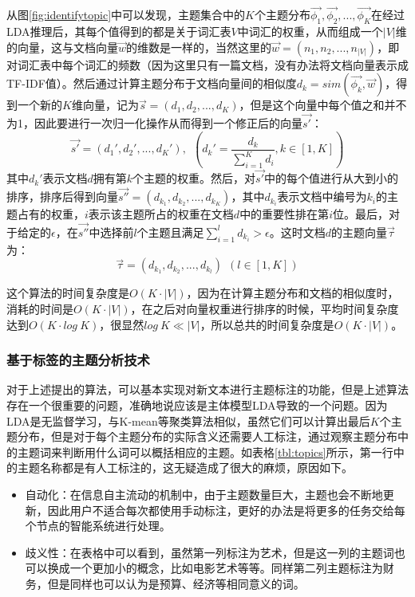 从图\ref{fig:identifytopic}中可以发现，主题集合中的$K$个主题分布$\vec{\phi_1},\vec{\phi_2},...,\vec{\phi_K}$在经过LDA推理后，其每个值得到的都是关于词汇表$V$中词汇的权重，从而组成一个$|V|$维的向量，这与文档向量$\vec{w}$的维数是一样的，当然这里的$\vec{w}=(n_1,n_2,...,n_{|V|})$，即对词汇表中每个词汇的频数（因为这里只有一篇文档，没有办法将文档向量表示成TF-IDF值）。然后通过计算主题分布于文档向量间的相似度$d_k=sim(\vec{\phi_k},\vec{w})$，得到一个新的$K$维向量，记为$\vec{s}=(d_1,d_2,...,d_K)$，但是这个向量中每个值之和并不为1，因此要进行一次归一化操作从而得到一个修正后的向量$\vec{s'}$：
\begin{equation}
  \vec{s'}=(d_1',d_2',...,d_K'),~~(d_k'=\frac{d_k}{\sum_{i=1}^{K}d_i},k\in[1,K])
\end{equation}
其中$d_k'$表示文档$d$拥有第$k$个主题的权重。然后，对$\vec{s'}$中的每个值进行从大到小的排序，排序后得到向量$\vec{s''}=(d_{k_1},d_{k_2},...,d_{k_K})$，其中$d_{k_i}$表示文档中编号为$k_i$的主题占有的权重，$i$表示该主题所占的权重在文档$d$中的重要性排在第$i$位。最后，对于给定的$\epsilon$，在$\vec{s''}$中选择前$l$个主题且满足$\sum_{i=1}^{l}d_{k_i}>\epsilon$。这时文档$d$的主题向量$\vec{\tau}$为：
\begin{equation}
  \vec{\tau}=(d_{k_1},d_{k_2},...,d_{k_l})~~(l\in[1,K])
\end{equation}

这个算法的时间复杂度是$O(K\cdot |V|)$，因为在计算主题分布和文档的相似度时，消耗的时间是$O(K\cdot |V|)$，在之后对向量权重进行排序的时候，平均时间复杂度达到$O(K\cdot log~K)$，很显然$log~K\ll|V|$，所以总共的时间复杂度是$O(K\cdot |V|)$。

\subsubsection{基于标签的主题分析技术}
对于上述提出的算法，可以基本实现对新文本进行主题标注的功能，但是上述算法存在一个很重要的问题，准确地说应该是主体模型LDA导致的一个问题。因为LDA是无监督学习，与K-mean等聚类算法相似，虽然它们可以计算出最后$K$个主题分布，但是对于每个主题分布的实际含义还需要人工标注，通过观察主题分布中的主题词来判断用什么词可以概括相应的主题。如表格\ref{tbl:topics}所示，第一行中的主题名称都是有人工标注的，这无疑造成了很大的麻烦，原因如下。
\begin{itemize}
  \item 自动化：在信息自主流动的机制中，由于主题数量巨大，主题也会不断地更新，因此用户不适合每次都使用手动标注，更好的办法是将更多的任务交给每个节点的智能系统进行处理。
  \item 歧义性：在表格中可以看到，虽然第一列标注为艺术，但是这一列的主题词也可以换成一个更加小的概念，比如电影艺术等等。同样第二列主题标注为财务，但是同样也可以认为是预算、经济等相同意义的词。
\end{itemize}

